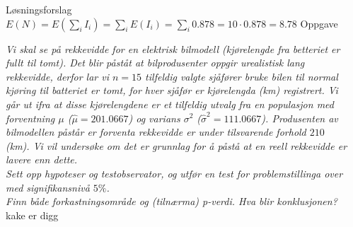 \documentclass[final,hyperref={pdfpagelabels=false}]{beamer}
\newcommand{\oppgave}[2]
{\center\normalsize Oppgave\\
	{\footnotesize\raggedright \textit{#1}\\#2\\}}
\begin{document}
\begin{frame}{}
\begin{columns}[t]
\begin{column}{.33\linewidth}
\begin{block}{Løsningsforslag}
{					$E(N)=E(\sum_i I_i)=\sum_i E(I_i)=\sum_i 0.878 = 10 \cdot 0.878 = 8.78$ }
				\oppgave{Vi skal se på rekkevidde for en elektrisk bilmodell (kjørelengde fra betteriet er fullt til tomt).
					Det blir påståt at bilprodusenter oppgir urealistisk lang rekkevidde, derfor lar vi $n=15$ tilfeldig valgte sjåfører bruke bilen til normal kjøring til batteriet er tomt, for hver sjåfør er kjørelengda (km) registrert.
					Vi går ut ifra at disse kjørelengdene er et tilfeldig utvalg fra en populasjon med forventning $\mu$ ($\hat \mu=201.0667$) og varians $\sigma^2$ ($\hat \sigma^2 = 111.0667$).
					Produsenten av bilmodellen påstår er forventa rekkevidde er under tilsvarende forhold $210$ (km).
					Vi vil undersøke om det er grunnlag for å påstå at en reell rekkevidde er lavere enn dette.\\
					Sett opp hypoteser og testobservator, og utfør en test for problemstillinga over med signifikansnivå $5\%$.\\
					Finn både forkastningsområde og (tilnærma) p-verdi.
					Hva blir konklusjonen?}{kake er digg}
			\end{block}
		\end{column}
		\begin{column}{.33\linewidth}
		\end{column}
	\end{columns}
\end{frame}
\end{document}
